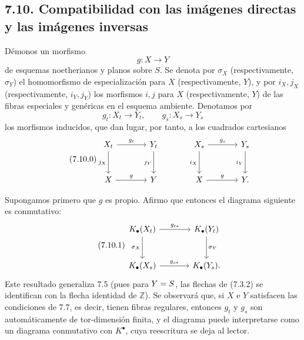 \subsection*{7.10. Compatibilidad con las imágenes directas y las imágenes inversas}
Démonos un morfismo
\[
  g:X\longrightarrow Y
\]
de esquemas noetherianos y planos sobre \(S\). Se denota por \(\sigma_X\) (respectivamente, \(\sigma_Y\)) el homomorfismo de especialización para \(X\) (respectivamente, \(Y\)), y por \(i_X,j_X\) (respectivamente, \(i_Y,j_Y\)) los morfismos \(i,j\) para \(X\) (respectivamente, \(Y\)) de las fibras especiales y genéricas en el esquema ambiente. Denotamos por
\[
  g_t:X_t\to Y_t,\qquad g_s:X_s\to Y_s
\]
los morfismos inducidos, que dan lugar, por tanto, a los cuadrados cartesianos
\begin{equation}\tag{7.10.0}
\begin{tikzcd}[column sep=large,row sep=large]
X_t \arrow[r,"g_t"] \arrow[d,"j_X"'] & Y_t \arrow[d,"j_Y"'] &
X_s \arrow[r,"g_s"] \arrow[d,"i_X"'] & Y_s \arrow[d,"i_Y"']\\
X \arrow[r,"g"] & Y &
X \arrow[r,"g"] & Y .
\end{tikzcd}
\end{equation}

Supongamos primero que \(g\) es propio. Afirmo que entonces el diagrama siguiente es conmutativo:
\begin{equation}\tag{7.10.1}
\begin{tikzcd}[column sep=large,row sep=large]
K_\bullet(X_t) \arrow[r,"g_{t*}"] \arrow[d,"\sigma_X"'] &
K_\bullet(Y_t) \arrow[d,"\sigma_Y"]\\
K_\bullet(X_s) \arrow[r,"g_{s*}"] &
K_\bullet(Y_s).
\end{tikzcd}
\end{equation}
Este resultado generaliza 7.5 (pues para \(\sisi{X}{Y}=S\), las flechas de (7.3.2) se identifican con la flecha identidad de \(\mathbb Z\)). Se observará que, si \(X\) e \(Y\) satisfacen las condiciones de 7.7, es decir, tienen fibras regulares, entonces \(g_t\) y \(g_s\) son automáticamente de tor-dimensión finita, y el diagrama puede interpretarse como un diagrama conmutativo con \(K^\bullet\), cuya reescritura se deja al lector. %

